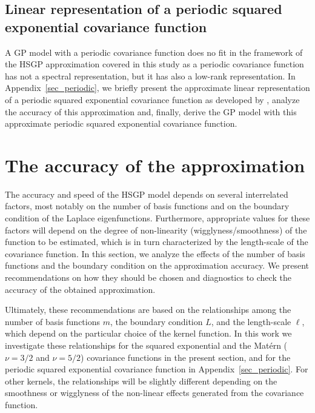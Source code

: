 \subsection{Linear representation of a periodic squared exponential covariance function} \label{sec_method_periodic}

A GP model with a periodic covariance function does no fit in the framework of the HSGP approximation covered in this study as a periodic covariance function has not a spectral representation, but it has also a low-rank representation. In Appendix~\ref{sec_periodic}, we briefly present the approximate linear representation of a periodic squared exponential covariance function as developed by \citet{solin2014explicit}, analyze the accuracy of this approximation and, finally, derive the GP model with this approximate periodic squared exponential covariance function.

\section{The accuracy of the approximation}\label{sec_accuracy}

The accuracy and speed of the HSGP model depends on several interrelated factors, most notably on the number of basis functions and on the boundary condition of the Laplace eigenfunctions. Furthermore, appropriate values for these factors will depend on the degree of non-linearity ({\color{blue}wigglyness/smoothness}) of the function to be estimated, which is in turn characterized by the length-scale of the covariance function. In this section, we analyze the effects of the number of basis functions and the boundary condition on the approximation accuracy. We present recommendations on how they should be chosen and diagnostics to check the accuracy of the obtained approximation. 

Ultimately, these recommendations are based on the relationships among the number of basis functions $m$, the boundary condition $L$, and the length-scale $\ell$, which depend on the particular choice of the kernel function. In this work we investigate these relationships for the squared exponential and the Mat{\'e}rn ($\nu=3/2$ and $\nu=5/2$) covariance functions in the present section, and for the periodic squared exponential covariance function in Appendix~\ref{sec_periodic}. For other kernels, the relationships will be slightly different depending on the {\color{blue}smoothness or wigglyness of the non-linear effects generated from the covariance function}.


